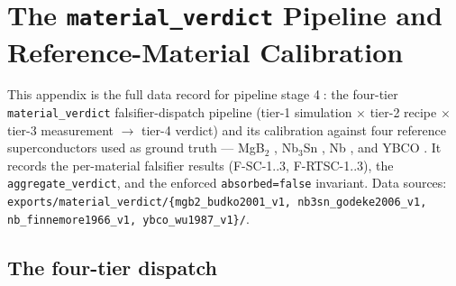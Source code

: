 \section{The \texttt{material\_verdict} Pipeline and Reference-Material Calibration}
\label{app:material}

This appendix is the full data record for pipeline stage
\textcircled{\scriptsize 4}: the four-tier \texttt{material\_verdict}
falsifier-dispatch pipeline (tier-1 simulation $\times$ tier-2 recipe
$\times$ tier-3 measurement $\to$ tier-4 verdict) and its calibration
against four reference superconductors used as ground truth --- MgB$_2$
\citep{nagamatsu2001,budko2001}, Nb$_3$Sn \citep{godeke2006}, Nb
\citep{finnemore1966}, and YBCO \citep{wu1987}. It records the per-material
falsifier results (F-SC-1..3, F-RTSC-1..3), the
\texttt{aggregate\_verdict}, and the enforced \texttt{absorbed=false}
invariant. Data sources:
\texttt{exports/material\_verdict/\{mgb2\_budko2001\_v1,
nb3sn\_godeke2006\_v1, nb\_finnemore1966\_v1, ybco\_wu1987\_v1\}/}.

\subsection{The four-tier dispatch}
\label{app:mat-dispatch}


